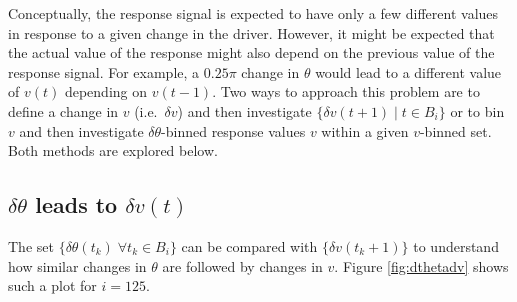 \documentclass[a4paper,11pt]{article}
\begin{document}
Conceptually, the response signal is expected to have only a few different values in response to a given change in the driver.  However, it might be expected that the actual value of the response might also depend on the previous value of the response signal.  For example, a $0.25\pi$ change in $\theta$ would lead to a different value of $v(t)$ depending on $v(t-1)$.  Two ways to approach this problem are to define a change in $v$ (i.e.\ $\delta v$) and then investigate $\{\delta v(t+1)\;|\; t\in B_i\}$ or to bin $v$ and then investigate $\delta\theta$-binned response values $v$ within a given $v$-binned set.  Both methods are explored below.

\subsection{$\delta\theta$ leads to $\delta v(t)$}
The set $\{\delta\theta(t_k)\;\forall t_k\in B_i\}$ can be compared with $\{\delta v(t_k+1)\}$ to understand how similar changes in $\theta$ are followed by changes in $v$.  Figure \ref{fig:dthetadv} shows such a plot for $i=125$.
\end{document}
